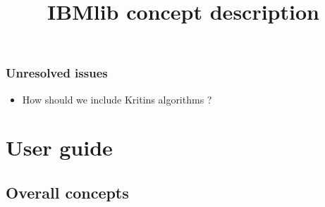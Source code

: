 \title{IBMlib concept description}



\maketitle  

\tableofcontents

\section{Unresolved issues}

\begin{itemize}

  \item How should we include Kritins algorithms ?

  
\end{itemize}

\part{User guide }

\chapter{Overall concepts}


